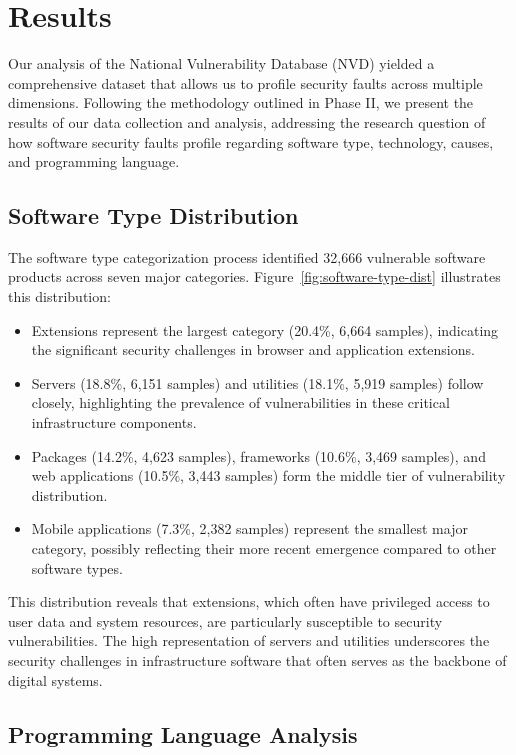 \section{Results}

Our analysis of the National Vulnerability Database (NVD) yielded a comprehensive dataset that allows us to profile security faults across multiple dimensions. Following the methodology outlined in Phase II, we present the results of our data collection and analysis, addressing the research question of how software security faults profile regarding software type, technology, causes, and programming language.

\subsection{Software Type Distribution}

The software type categorization process identified 32,666 vulnerable software products across seven major categories. Figure~\ref{fig:software-type-dist} illustrates this distribution:

\begin{itemize}
    \item Extensions represent the largest category (20.4\%, 6,664 samples), indicating the significant security challenges in browser and application extensions.
    \item Servers (18.8\%, 6,151 samples) and utilities (18.1\%, 5,919 samples) follow closely, highlighting the prevalence of vulnerabilities in these critical infrastructure components.
    \item Packages (14.2\%, 4,623 samples), frameworks (10.6\%, 3,469 samples), and web applications (10.5\%, 3,443 samples) form the middle tier of vulnerability distribution.
    \item Mobile applications (7.3\%, 2,382 samples) represent the smallest major category, possibly reflecting their more recent emergence compared to other software types.
\end{itemize}

This distribution reveals that extensions, which often have privileged access to user data and system resources, are particularly susceptible to security vulnerabilities. The high representation of servers and utilities underscores the security challenges in infrastructure software that often serves as the backbone of digital systems.

\subsection{Programming Language Analysis}

